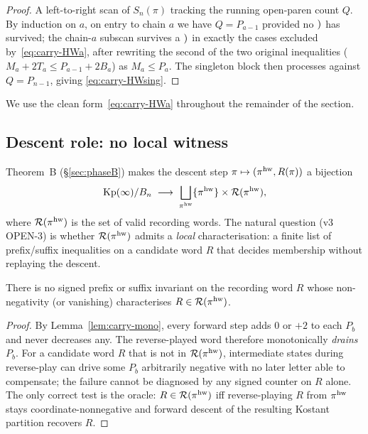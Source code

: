 \begin{proof}
A left-to-right scan of $S_n(\pi)$ tracking the running open-paren count $Q$. By
induction on $a$, on entry to chain $a$ we have $Q = P_{a-1}$ provided no
${)}_{}$ has survived; the chain-$a$ subscan survives a ${)}_{}$ in exactly
the cases excluded by~\eqref{eq:carry-HWa}, after rewriting the second of the
two original inequalities ($M_a + 2 T_a \le P_{a-1} + 2 B_a$) as $M_a \le P_a$.
The singleton block then processes against $Q = P_{n-1}$, giving
\eqref{eq:carry-HWsing}.
\end{proof}

We use the clean form~\eqref{eq:carry-HWa} throughout the remainder of the section.

\subsection{Descent role: no local witness}\label{ssec:carry-descent}

Theorem~B (\S\ref{sec:phaseB}) makes the descent step
$\pi \mapsto (\pi^{\mathrm{hw}}, R(\pi))$ a bijection
\[
   \mathrm{Kp}(\infty)/B_n \;\longrightarrow\; \bigsqcup_{\pi^{\mathrm{hw}}} \{\pi^{\mathrm{hw}}\} \times \mathcal{R}(\pi^{\mathrm{hw}}),
\]
where $\mathcal{R}(\pi^{\mathrm{hw}})$ is the set of valid recording words. The natural question
(v3 OPEN-3) is whether $\mathcal{R}(\pi^{\mathrm{hw}})$ admits a \emph{local} characterisation:
a finite list of prefix/suffix inequalities on a candidate word $R$ that
decides membership without replaying the descent.

\begin{proposition}\label{prop:no-local-witness}
There is no signed prefix or suffix invariant on the recording word $R$ whose
non-negativity (or vanishing) characterises $R \in \mathcal{R}(\pi^{\mathrm{hw}})$.
\end{proposition}

\begin{proof}
By Lemma~\ref{lem:carry-mono}, every forward step adds $0$ or $+2$ to each $P_b$
and never decreases any. The reverse-played word therefore monotonically
\emph{drains} $P_b$. For a candidate word $R$ that is not in $\mathcal{R}(\pi^{\mathrm{hw}})$,
intermediate states during reverse-play can drive some $P_b$ arbitrarily
negative with no later letter able to compensate; the failure cannot be diagnosed
by any signed counter on $R$ alone. The only correct test is the oracle: $R \in
\mathcal{R}(\pi^{\mathrm{hw}})$ iff reverse-playing $R$ from $\pi^{\mathrm{hw}}$ stays coordinate-nonnegative
and forward descent of the resulting Kostant partition recovers $R$.
\end{proof}

